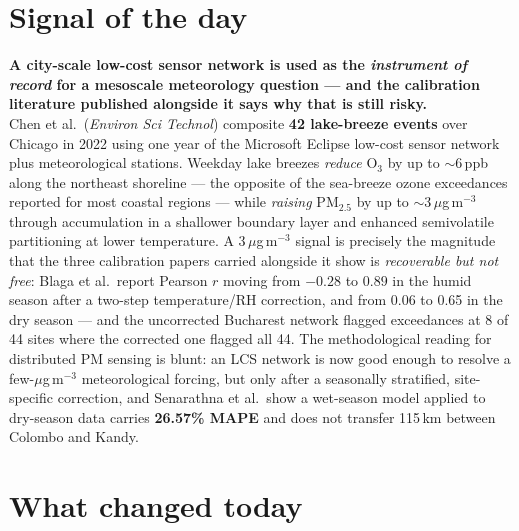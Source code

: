 \documentclass[10pt]{article}
\begin{document}
\vspace{6mm}

\section*{\sffamily\bfseries\color{Deep}Signal of the day}
\vspace{-1.5mm}{\color{Amber}\rule{\linewidth}{1.1pt}}\vspace{2.5mm}

\begin{keybox}
{\sffamily\bfseries\small\color{Deep}A city-scale low-cost sensor network is used as the
\emph{instrument of record} for a mesoscale meteorology question --- and the calibration
literature published alongside it says why that is still risky.}\\[1.4mm]
\footnotesize
Chen et al.\ (\textit{Environ Sci Technol}) composite \textbf{42 lake-breeze events} over
Chicago in 2022 using one year of the Microsoft Eclipse low-cost sensor network plus
meteorological stations. Weekday lake breezes \emph{reduce} O$_3$ by up to
$\sim$6\,ppb along the northeast shoreline --- the opposite of the sea-breeze ozone
exceedances reported for most coastal regions --- while \emph{raising} PM$_{2.5}$ by up to
$\sim$3\,$\mu$g\,m$^{-3}$ through accumulation in a shallower boundary layer and enhanced
semivolatile partitioning at lower temperature. A 3\,$\mu$g\,m$^{-3}$ signal is precisely
the magnitude that the three calibration papers carried alongside it show is
\emph{recoverable but not free}: Blaga et al.\ report Pearson $r$ moving from
$-0.28$ to $0.89$ in the humid season after a two-step temperature/RH correction, and
from 0.06 to 0.65 in the dry season --- and the uncorrected Bucharest network flagged
exceedances at 8 of 44 sites where the corrected one flagged all 44. The methodological
reading for distributed PM sensing is blunt: an LCS network is now good enough to resolve
a few-$\mu$g\,m$^{-3}$ meteorological forcing, but only after a seasonally stratified,
site-specific correction, and Senarathna et al.\ show a wet-season model applied to
dry-season data carries \textbf{26.57\% MAPE} and does not transfer 115\,km between
Colombo and Kandy.
\end{keybox}

\vspace{3mm}

\section*{\sffamily\bfseries\color{Deep}What changed today}
\vspace{-1.5mm}{\color{Amber}\rule{\linewidth}{1.1pt}}\vspace{2.5mm}
\end{document}
